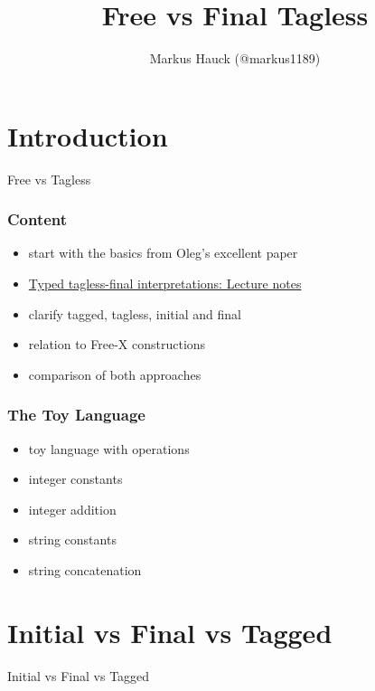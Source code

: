 \documentclass[aspectratio=169, hyperref={colorlinks, linkcolor=beamer@centricgreen}, urlcolor=links]{beamer}
\title{Free vs Final Tagless}
\author{Markus Hauck (@markus1189)}
\begin{document}
\begin{frame}
  \titlepage{}
\end{frame}

\section{Introduction}\label{sec:introduction}

\begin{frame}
  \begin{center}
    {\Huge Free vs Tagless}
  \end{center}
\end{frame}

\begin{frame}[fragile]
  \frametitle{Content}
  \begin{itemize}
  \item start with the basics from Oleg's excellent paper
  \item \href{http://okmij.org/ftp/tagless-final/course/index.html}{Typed tagless-final interpretations: Lecture notes}
  \item clarify tagged, tagless, initial and final
  \item relation to Free-X constructions
  \item comparison of both approaches
  \end{itemize}
\end{frame}

\begin{frame}
  \frametitle{The Toy Language}
  \begin{itemize}
  \item toy language with operations
  \item integer constants
  \item integer addition
  \item string constants
  \item string concatenation
  \end{itemize}
\end{frame}

\section{Initial vs Final vs Tagged}\label{sec:initial-final-tagged}

\begin{frame}
  \begin{center}
    \Huge
    Initial vs Final vs Tagged
  \end{center}
\end{frame}
\end{document}

